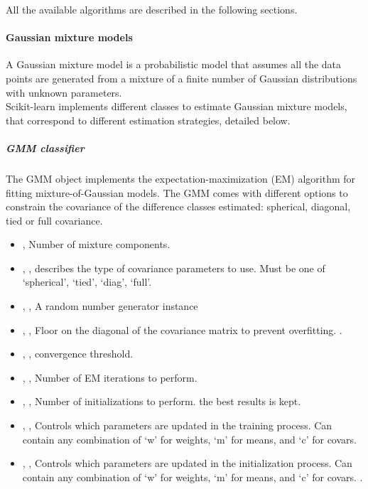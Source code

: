 All the available algorithms are described in the following sections.

\paragraph{Gaussian mixture models}
\label{paragraph:GMM}

A Gaussian mixture model is a probabilistic model that assumes all
 the data points are generated from a mixture of a finite number of
 Gaussian distributions with unknown parameters.
\\
Scikit-learn implements different classes to estimate Gaussian
mixture models, that correspond to different estimation strategies,
 detailed below.

\subparagraph{ GMM classifier} \hfill
\label{subparagraph:GMMClass}

The GMM object implements the expectation-maximization (EM)
algorithm for fitting mixture-of-Gaussian models. The GMM comes with different options
 to constrain the covariance of  the difference classes estimated: spherical, diagonal, tied or
 full covariance.

\begin{itemize}
	\item {},  Number of mixture components. 
	\item {}, , describes the type of covariance parameters to use.
Must be one of ‘spherical’, ‘tied’, ‘diag’, ‘full’. 
	\item {}, ,  A random number
generator instance 
	\item {}, ,
 Floor on the diagonal of the covariance matrix to prevent overfitting.
 .
	\item {}, ,
convergence threshold. 
	\item {}, ,
Number of EM iterations to perform. 
	\item {}, ,
Number of initializations to perform. the best results is kept.
	\item {}, ,
 Controls which parameters are updated in the training process.
Can contain any combination of ‘w’ for weights, ‘m’ for means, and
‘c’ for covars. 
	\item {}, , Controls which parameters are updated in the initialization
process. Can contain any combination of ‘w’ for weights, ‘m’ for means,
 and ‘c’ for covars. .
\end{itemize}


